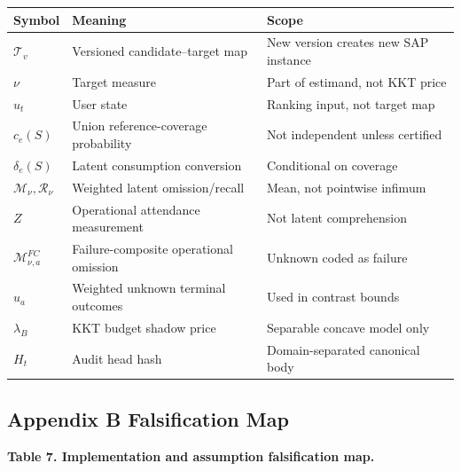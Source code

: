 \documentclass[
  11pt]{article}
\begin{document}
\begin{longtable}[]{@{}
  >{\raggedright\arraybackslash}p{}
  >{\raggedright\arraybackslash}p{}
  >{\raggedright\arraybackslash}p{}@{}}
\toprule\noalign{}
\begin{minipage}[b]{\linewidth}\raggedright
Symbol
\end{minipage} & \begin{minipage}[b]{\linewidth}\raggedright
Meaning
\end{minipage} & \begin{minipage}[b]{\linewidth}\raggedright
Scope
\end{minipage} \\
\midrule\noalign{}
\endhead
\bottomrule\noalign{}
\endlastfoot
\(\mathcal T_v\) & Versioned candidate--target map & New version creates
new SAP instance \\
\(\nu\) & Target measure & Part of estimand, not KKT price \\
\(u_t\) & User state & Ranking input, not target map \\
\(c_e(S)\) & Union reference-coverage probability & Not independent
unless certified \\
\(\delta_e(S)\) & Latent consumption conversion & Conditional on
coverage \\
\(\mathcal M_\nu,\mathcal R_\nu\) & Weighted latent omission/recall &
Mean, not pointwise infimum \\
\(Z\) & Operational attendance measurement & Not latent comprehension \\
\(\mathcal M^{FC}_{\nu,a}\) & Failure-composite operational omission &
Unknown coded as failure \\
\(u_a\) & Weighted unknown terminal outcomes & Used in contrast
bounds \\
\(\lambda_B\) & KKT budget shadow price & Separable concave model
only \\
\(H_t\) & Audit head hash & Domain-separated canonical body \\
\end{longtable}

\subsection{Appendix B Falsification
Map}\label{appendix-b-falsification-map}

\textbf{Table 7. Implementation and assumption falsification map.}
\end{document}
